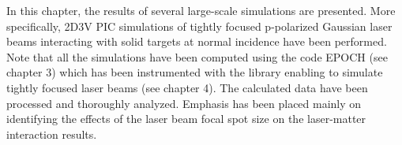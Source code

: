 In this chapter, the results of several large-scale simulations are presented. More specifically, 2D3V PIC simulations of tightly focused p-polarized Gaussian laser beams interacting with solid targets at normal incidence have been performed. Note that all the simulations have been computed using the code EPOCH \cite{bennett} (see chapter 3) which has been instrumented with the library enabling to simulate tightly focused laser beams \cite{Thiele2016} (see chapter 4). The calculated data have been processed and thoroughly analyzed. Emphasis has been placed mainly on identifying the effects of the laser beam focal spot size on the laser-matter interaction results.